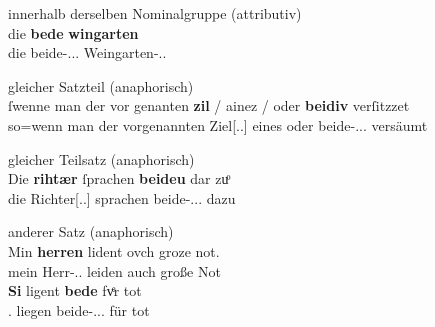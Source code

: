 \begin{exe}
\ex \label{ex:beidedomains}
	\begin{xlist}
	\ex \label{ex:beidedomains_1}
		innerhalb derselben Nominalgruppe (attributiv)\\
		\gll die \textbf{bede} \textbf{wingarten} \\
			die beide-\Acc.\Pl.\M.\St{} Weingarten-\Acc.\Pl.\M{} \\
		\begin{taggedline}{\parencites(Zürich, 1290)[\pno~1221, 484.9]{cao2}}
		\trans {}
		\end{taggedline}

	\ex \label{ex:beidedomains_2}
		gleicher Satzteil (anaphorisch)\\
		\gll ſwenne man der {vor genanten} \textbf{zil} / ainez / oder
			\textbf{beidiv} \textelp{} verſitzzet \\
			so=wenn man der vorgenannten Ziel[\Gen.\Pl.\N] {} eines {}
			oder beide-\Acc.\Pl.\N.\St{} {} versäumt \\
		\begin{taggedline}{\parencites(Augsburg, 1283)[\pno~619, 47.31]{cao2}}
		\trans {}
		\end{taggedline}

	\ex \label{ex:beidedomains_3}
		gleicher Teilsatz (anaphorisch)\\
		\gll Die \textbf{rihtær} ſprachen \textbf{beideu} {dar zuͦ} \\
			die Richter[\Nom.\Pl.\M] sprachen beide-\Nom.\Pl.\N.\St{}
				dazu \\
		\begin{taggedline}{\parencites[\pno~28\ra, 8]{kc:B1}[vgl.][10090]{schroeder1895}}
		\trans {}
		\end{taggedline}

	\ex \label{ex:beidedomains_4}
			anderer Satz (anaphorisch)\\
		\gll Min \textbf{herren} lident ovch groze not. \\
			mein Herr-\Nom.\Pl.\M{} leiden auch große Not \\
	\sn \gll \textbf{Si} ligent \textbf{bede} fvͤr tot \\
			\Tpl\subM.\Nom{} liegen beide-\Nom.\Pl.\M.\St{} für tot \\
		\begin{taggedline}{\parencites[\pno~86\ra, 3--4]{kc:VB}[vgl.][12033--12034]{schroeder1895}}
		\trans {}
		\end{taggedline}
	\end{xlist}
\end{exe}

